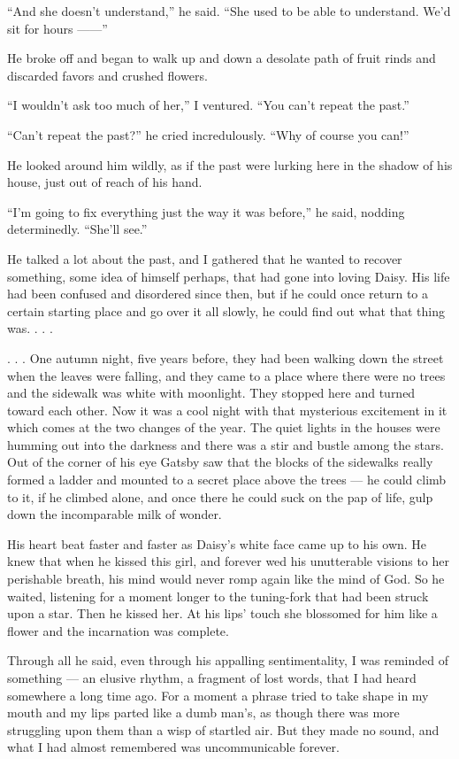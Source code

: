 \documentclass{znotebook}
\begin{document}
``And she doesn't understand,'' he said. ``She used to be able to understand. We'd sit for hours ——''

He broke off and began to walk up and down a desolate path of fruit rinds and discarded favors and crushed flowers.

``I wouldn't ask too much of her,'' I ventured. ``You can't repeat the past.''

``Can't repeat the past?'' he cried incredulously. ``Why of course you can!''

He looked around him wildly, as if the past were lurking here in the shadow of his house, just out of reach of his hand.

``I'm going to fix everything just the way it was before,'' he said, nodding determinedly. ``She'll see.''

He talked a lot about the past, and I gathered that he wanted to recover something, some idea of himself perhaps, that had gone into loving Daisy. His life had been confused and disordered since then, but if he could once return to a certain starting place and go over it all slowly, he could find out what that thing was. . . .

. . . One autumn night, five years before, they had been walking down the street when the leaves were falling, and they came to a place where there were no trees and the sidewalk was white with moonlight. They stopped here and turned toward each other. Now it was a cool night with that mysterious excitement in it which comes at the two changes of the year. The quiet lights in the houses were humming out into the darkness and there was a stir and bustle among the stars. Out of the corner of his eye Gatsby saw that the blocks of the sidewalks really formed a ladder and mounted to a secret place above the trees — he could climb to it, if he climbed alone, and once there he could suck on the pap of life, gulp down the incomparable milk of wonder.

His heart beat faster and faster as Daisy's white face came up to his own. He knew that when he kissed this girl, and forever wed his unutterable visions to her perishable breath, his mind would never romp again like the mind of God. So he waited, listening for a moment longer to the tuning-fork that had been struck upon a star. Then he kissed her. At his lips' touch she blossomed for him like a flower and the incarnation was complete.

Through all he said, even through his appalling sentimentality, I was reminded of something — an elusive rhythm, a fragment of lost words, that I had heard somewhere a long time ago. For a moment a phrase tried to take shape in my mouth and my lips parted like a dumb man's, as though there was more struggling upon them than a wisp of startled air. But they made no sound, and what I had almost remembered was uncommunicable forever.
\end{document}
